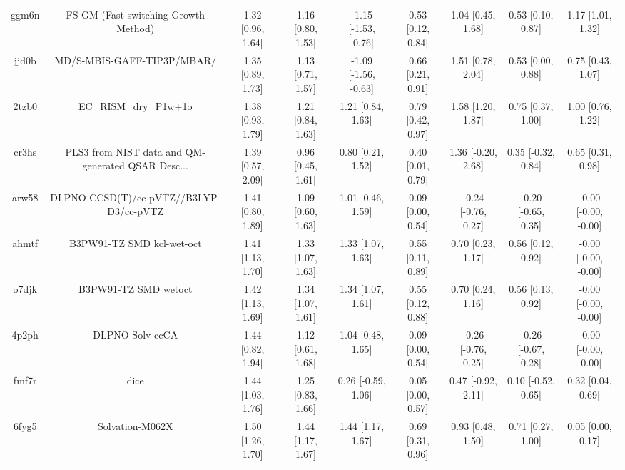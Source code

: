 \documentclass{article}
\begin{document}
\begin{center}
\begin{longtable}{|ccccccccc|}
 ggm6n &               FS-GM (Fast switching Growth Method) &  1.32 [0.96, 1.64] &  1.16 [0.80, 1.53] &  -1.15 [-1.53, -0.76] &  0.53 [0.12, 0.84] &    1.04 [0.45, 1.68] &    0.53 [0.10, 0.87] &     1.17 [1.01, 1.32] \\
 jjd0b &                         MD/S-MBIS-GAFF-TIP3P/MBAR/ &  1.35 [0.89, 1.73] &  1.13 [0.71, 1.57] &  -1.09 [-1.56, -0.63] &  0.66 [0.21, 0.91] &    1.51 [0.78, 2.04] &    0.53 [0.00, 0.88] &     0.75 [0.43, 1.07] \\
 2tzb0 &                              EC\_RISM\_dry\_P1w+1o &  1.38 [0.93, 1.79] &  1.21 [0.84, 1.63] &     1.21 [0.84, 1.63] &  0.79 [0.42, 0.97] &    1.58 [1.20, 1.87] &    0.75 [0.37, 1.00] &     1.00 [0.76, 1.22] \\
 cr3hs &  PLS3 from NIST data and QM-generated QSAR Desc... &  1.39 [0.57, 2.09] &  0.96 [0.45, 1.61] &     0.80 [0.21, 1.52] &  0.40 [0.01, 0.79] &   1.36 [-0.20, 2.68] &   0.35 [-0.32, 0.84] &     0.65 [0.31, 0.98] \\
 arw58 &            DLPNO-CCSD(T)/cc-pVTZ//B3LYP-D3/cc-pVTZ &  1.41 [0.80, 1.89] &  1.09 [0.60, 1.63] &     1.01 [0.46, 1.59] &  0.09 [0.00, 0.54] &  -0.24 [-0.76, 0.27] &  -0.20 [-0.65, 0.35] &  -0.00 [-0.00, -0.00] \\
 ahmtf &                          B3PW91-TZ SMD kcl-wet-oct &  1.41 [1.13, 1.70] &  1.33 [1.07, 1.63] &     1.33 [1.07, 1.63] &  0.55 [0.11, 0.89] &    0.70 [0.23, 1.17] &    0.56 [0.12, 0.92] &  -0.00 [-0.00, -0.00] \\
 o7djk &                               B3PW91-TZ SMD wetoct &  1.42 [1.13, 1.69] &  1.34 [1.07, 1.61] &     1.34 [1.07, 1.61] &  0.55 [0.12, 0.88] &    0.70 [0.24, 1.16] &    0.56 [0.13, 0.92] &  -0.00 [-0.00, -0.00] \\
 4p2ph &                                    DLPNO-Solv-ccCA &  1.44 [0.82, 1.94] &  1.12 [0.61, 1.68] &     1.04 [0.48, 1.65] &  0.09 [0.00, 0.54] &  -0.26 [-0.76, 0.25] &  -0.26 [-0.67, 0.28] &  -0.00 [-0.00, -0.00] \\
 fmf7r &                                               dice &  1.44 [1.03, 1.76] &  1.25 [0.83, 1.66] &    0.26 [-0.59, 1.06] &  0.05 [0.00, 0.57] &   0.47 [-0.92, 2.11] &   0.10 [-0.52, 0.65] &     0.32 [0.04, 0.69] \\
 6fyg5 &                                    Solvation-M062X &  1.50 [1.26, 1.70] &  1.44 [1.17, 1.67] &     1.44 [1.17, 1.67] &  0.69 [0.31, 0.96] &    0.93 [0.48, 1.50] &    0.71 [0.27, 1.00] &     0.05 [0.00, 0.17] \\

\end{longtable}
\end{center}
\end{document}
